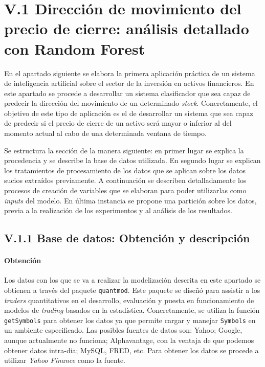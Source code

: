 \documentclass[]{DissertateUSU}
\let\oldparagraph\paragraph
\renewcommand{\paragraph}[1]{\oldparagraph{#1}\mbox{}}
\begin{document}
\FloatBarrier
{}
\fancyhead[R]{\thepage}
\fancyfoot[C]{}

\section{V.1 \textbf{Dirección de movimiento del precio de cierre: análisis detallado con Random Forest}}

\noindent En el apartado siguiente se elabora la primera aplicación
práctica de un sistema de inteligencia artificial sobre el sector de la
inversión en activos financieros. En este apartado se procede a
desarrollar un sistema clasificador que sea capaz de predecir la
dirección del movimiento de un determinado \emph{stock}. Concretamente,
el objetivo de este tipo de aplicación es el de desarrollar un sistema
que sea capaz de predecir si el precio de cierre de un activo será mayor
o inferior al del momento actual al cabo de una determinada ventana de
tiempo.

\noindent Se estructura la sección de la manera siguiente: en primer
lugar se explica la procedencia y se describe la base de datos
utilizada. En segundo lugar se explican los tratamientos de
procesamiento de los datos que se aplican sobre los datos sucios
extraídos previamente. A continuación se describen detalladamente los
procesos de creación de variables que se elaboran para poder utilizarlas
como \emph{inputs} del modelo. En última instancia se propone una
partición sobre los datos, previa a la realización de los experimentos y
al análisis de los resultados.

\FloatBarrier
{}
\fancyfoot[C]{\thepage}

\subsection{V.1.1 \textbf{Base de datos: Obtención y descripción}}

\hypertarget{obtencion}{%
\paragraph{Obtención}\label{obtencion}}

\noindent Los datos con los que se va a realizar la modelización
descrita en este apartado se obtienen a través del paquete
\texttt{quantmod}. Este paquete se diseñó para assistir a los
\emph{traders} quantitativos en el desarrollo, evaluación y puesta en
funcionamiento de modelos de \emph{trading} basados en la estadística.
Concretamente, se utiliza la función \texttt{getSymbols} para obtener
los datos ya que permite cargar y manejar \texttt{Symbols} en un
ambiente especificado. Las posibles fuentes de datos son: Yahoo; Google,
aunque actualmente no funciona; Alphavantage, con la ventaja de que
podemos obtener datos intra-dia; MySQL, FRED, etc. Para obtener los
datos se procede a utilizar \emph{Yahoo Finance} como la fuente.
\end{document}
